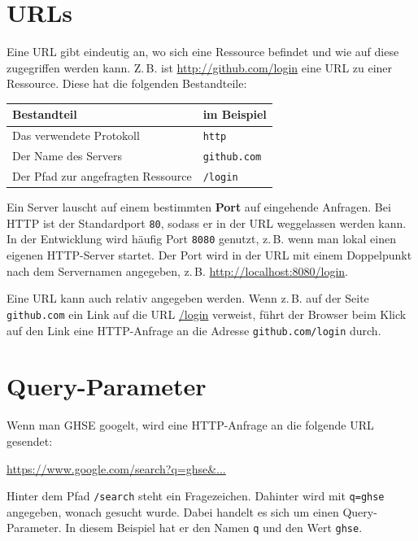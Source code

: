 \documentclass[a4paper]{scrartcl}
\begin{document}
\section{URLs}\label{sec:urls}

Eine URL gibt eindeutig an, wo sich eine Ressource befindet und wie auf diese zugegriffen werden kann.
Z.\,B. ist \url{http://github.com/login} eine URL zu einer Ressource.
Diese hat die folgenden Bestandteile:

\begin{table}[H]
\begin{tabular}{ll}

Bestandteil & im Beispiel \\
\hline
Das verwendete Protokoll & \texttt{http}\\

Der Name des Servers & \texttt{github.com}  \\

Der Pfad zur angefragten Ressource & \texttt{/login}   \\

\end{tabular}\label{tab:table}
\end{table}

Ein Server lauscht auf einem bestimmten \textbf{Port} auf eingehende Anfragen.
Bei HTTP ist der Standardport \texttt{80}, sodass er in der URL weggelassen werden kann.
In der Entwicklung wird häufig Port \texttt{8080} genutzt, z.\,B. wenn man lokal einen eigenen HTTP-Server startet.
Der Port wird in der URL mit einem Doppelpunkt nach dem Servernamen angegeben, z.\,B. \url{http://localhost:8080/login}.

Eine URL kann auch relativ angegeben werden.
Wenn z.\,B. auf der Seite \texttt{github.com} ein Link auf die URL \url{/login} verweist, führt der Browser beim Klick auf den Link eine HTTP-Anfrage an die Adresse \texttt{github.com/login} durch.

\section{Query-Parameter}\label{sec:query-parameter}

Wenn man GHSE googelt, wird eine HTTP-Anfrage an die folgende URL gesendet:

\url{https://www.google.com/search?q=ghse&...}

Hinter dem Pfad \texttt{/search} steht ein Fragezeichen.
Dahinter wird mit \texttt{q=ghse} angegeben, wonach gesucht wurde.
Dabei handelt es sich um einen Query-Parameter.
In diesem Beispiel hat er den Namen \texttt{q} und den Wert \texttt{ghse}.
\end{document}
